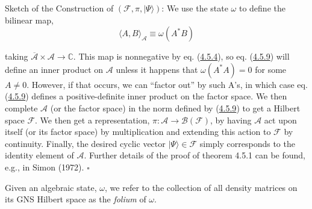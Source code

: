 \documentclass[11pt,a4paper]{article}
\begin{document}
Sketch of the Construction of \((\mathcal{F}, \pi, \lvert \Psi\rangle)\): We use the state \(\omega\) to define the bilinear map,
\begin{equation*}
\langle A, B \rangle_{\mathcal{A}} \equiv \omega(A^* B) \tag{4.5.9}\label{eq:4.5.9}
\end{equation*}

taking \(\overline{\mathcal{A}} \times \mathcal{A} \to \mathbb{C}\). This map is nonnegative by eq. (\hyperref[eq:4.5.4]{4.5.4}), so eq. (\hyperref[eq:4.5.9]{4.5.9}) will define an inner product on \(\mathcal{A}\) unless it happens that \(\omega(A^*A) = 0\) for some \(A \neq 0\). However, if that occurs, we can ``factor out'' by such A's, in which case eq. (\hyperref[eq:4.5.9]{4.5.9}) defines a positive-definite inner product on the factor space. We then complete \(\mathcal{A}\) (or the factor space) in the norm defined by (\hyperref[eq:4.5.9]{4.5.9}) to get a Hilbert space \(\mathcal{F}\). We then get a representation, \(\pi:\mathcal A\to\mathcal B(\mathcal F)\), by having \(\mathcal{A}\) act upon itself (or its factor space) by multiplication and extending this action to \(\mathcal{F}\) by continuity. Finally, the desired cyclic vector \(\lvert \Psi\rangle\in \mathcal{F}\) simply corresponds to the identity element of \(\mathcal{A}\). Further details of the proof of theorem 4.5.1 can be found, e.g., in Simon (1972). \(\square\)

Given an algebraic state, \(\omega\), we refer to the collection of all density matrices on its GNS Hilbert space as the \emph{folium} of \(\omega\).
\end{document}
